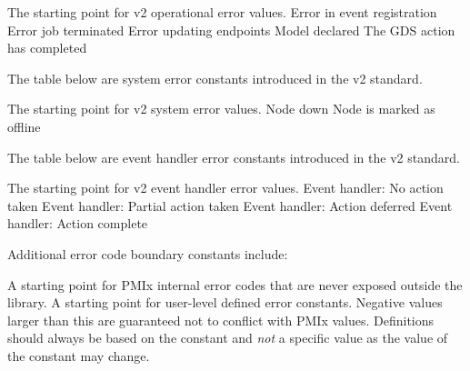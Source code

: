 \begin{constantdesc}
%
The starting point for v2 operational error values.
%
Error in event registration
%
Error job terminated
%
Error updating endpoints
%
Model declared
%
The \ac{GDS} action has completed
%
\end{constantdesc}

The table below are system error constants introduced in the v2 standard.

\begin{constantdesc}
%
The starting point for v2 system error values.
%
Node down
%
Node is marked as offline
%
\end{constantdesc}

The table below are event handler error constants introduced in the v2 standard.

\begin{constantdesc}
%
The starting point for v2 event handler error values.
%
Event handler: No action taken
%
Event handler: Partial action taken
%
Event handler: Action deferred
%
Event handler: Action complete
%
\end{constantdesc}

Additional error code boundary constants include:

\begin{constantdesc}
%
A starting point for PMIx internal error codes that are never exposed outside the library.
%
A starting point for user-level defined error constants.
Negative values larger than this are guaranteed not to conflict with PMIx values.
Definitions should always be based on the  constant and \emph{not} a specific value as the value of the constant may change.
%
\end{constantdesc}



